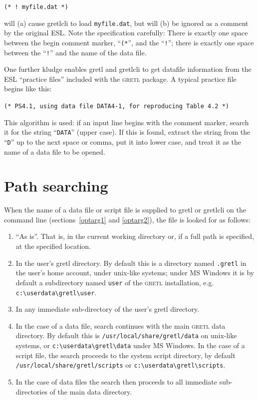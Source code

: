 \documentclass{article}
\begin{document}
{\texttt{(* ! myfile.dat *)}

will (a) cause \textsf{gretlcli} to load \texttt{myfile.dat}, but
will (b) be ignored as a comment by the original ESL.  Note the
specification carefully: There is exactly one space between the begin
comment marker, ``\texttt{(*}'', and the ``\texttt{!}''; there is
exactly one space between the ``\texttt{!}'' and the name of the data
file.

One further kludge enables \textsf{gretl} and \textsf{gretlcli} to
get datafile information from the ESL ``practice files'' included with
the \textsc{gretl} package.  A typical practice file begins like this:

\texttt{(* PS4.1, using data file DATA4-1, for reproducing Table 4.2
  *)}

This algorithm is used: if an input line begins with the comment
marker, search it for the string ``\texttt{DATA}'' (upper case).  If
this is found, extract the string from the ``\texttt{D}'' up to the
next space or comma, put it into lower case, and treat it as the name
of a data file to be opened.

}

\section{Path searching}
\label{path}

When the name of a data file or script file is supplied to
\textsf{gretl} or \textsf{gretlcli} on the command line
(sections~\ref{optarg1} and \ref{optarg2}), the file is looked for as
follows:

\begin{enumerate}
\item ``As is''.  That is, in the current working directory or, if a
  full path is specified, at the specified location.
\item In the user's gretl directory.  By default this is a directory
  named \texttt{.gretl} in the user's home account, under unix-like
  systems; under MS Windows it is by default a subdirectory named
  \texttt{user} of the \textsc{gretl} installation, e.g. 
  \verb+c:\userdata\gretl\user+.
\item In any immediate sub-directory of the user's gretl directory.
\item In the case of a data file, search continues with the main
  \textsc{gretl} data directory.  By default this is
  \texttt{/usr/local/share/gretl/data} on unix-like systems, or
  \verb+c:\userdata\gretl\data+ under MS Windows.  In the case of a
  script file, the search proceeds to the system script directory,
  by default \texttt{/usr/local/share/gretl/scripts} or
  \verb+c:\userdata\gretl\scripts+.
\item In the case of data files the search then proceeds to all
  immediate sub-directories of the main data directory.
\end{enumerate}
\end{document}
